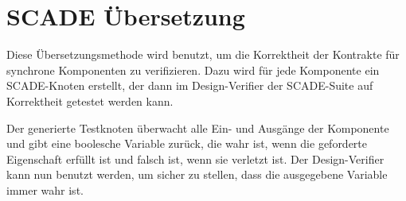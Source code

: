 \section{SCADE Übersetzung}
Diese Übersetzungsmethode wird benutzt, um die Korrektheit der Kontrakte für synchrone Komponenten zu verifizieren.
Dazu wird für jede Komponente ein SCADE-Knoten erstellt, der dann im Design-Verifier der SCADE-Suite auf Korrektheit getestet werden kann.

Der generierte Testknoten überwacht alle Ein- und Ausgänge der Komponente und gibt eine boolesche Variable zurück, die wahr ist, wenn die geforderte Eigenschaft erfüllt ist und falsch ist, wenn sie verletzt ist.
Der Design-Verifier kann nun benutzt werden, um sicher zu stellen, dass die ausgegebene Variable immer wahr ist.
